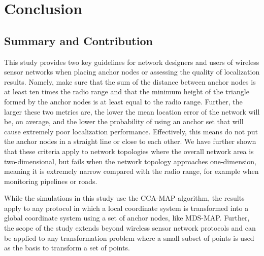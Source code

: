 \chapter{Conclusion}

\section{Summary and Contribution}
This study provides two key guidelines for network designers and users of wireless sensor networks when placing anchor nodes or assessing the quality of localization results.  Namely, make sure that the sum of the distance between anchor nodes is at least ten times the radio range and that the minimum height of the triangle formed by the anchor nodes is at least equal to the radio range.  Further, the larger these two metrics are, the lower the mean location error of the network will be, on average, and the lower the probability of using an anchor set that will cause extremely poor localization performance.  Effectively, this means do not put the anchor nodes in a straight line or close to each other.  We have further shown that these criteria apply to network topologies where the overall network area is two-dimensional, but fails when the network topology approaches one-dimension, meaning it is extremely narrow compared with the radio range, for example when monitoring pipelines or roads.

While the simulations in this study use the CCA-MAP algorithm, the results apply to any protocol in which a local coordinate system is transformed into a global coordinate system using a set of anchor nodes, like MDS-MAP.  Further, the scope of the study extends beyond wireless sensor network protocols and can be applied to any transformation problem where a small subset of points is used as the basis to transform a set of points.

